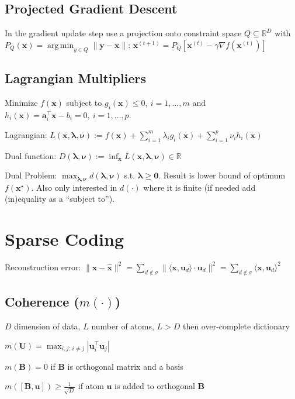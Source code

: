 \documentclass[a4paper, 11pt, landscape]{article}
\DeclareMathOperator*{\argmin}{arg\,min}
\begin{document}
\begin{multicols*}{3}
\subsection{Projected Gradient Descent}
In the gradient update step use a projection onto constraint space $Q \subseteq \mathbb{R}^D$ with $P_Q(\mathbf{x}) = \argmin_{y \in Q} \|\mathbf{y} - \mathbf{x}\|$: $\mathbf{x}^{(t+1)} = P_Q[\mathbf{x}^{(t)} - \gamma \nabla f(\mathbf{x}^{(t)})]$

\subsection{Lagrangian Multipliers}
Minimize  $f(\mathbf{x})$ subject to $g_i(\mathbf{x}) \leq 0,\ i = 1, \ldots, m$ and $h_i(\mathbf{x}) = \mathbf{a}_i^\top \mathbf{x} - b_i = 0,\ i = 1, \ldots, p$.
\begin{compactdesc}
	\item[Lagrangian:] $L(\mathbf{x}, \boldsymbol{\lambda}, \boldsymbol{\nu}) := f(\mathbf{x}) + \sum_{i=1}^m \lambda_i g_i(\mathbf{x}) + \sum_{i=1}^p \nu_i h_i(\mathbf{x})$
	\item[Dual function:] $D(\boldsymbol{\lambda}, \boldsymbol{\nu}) := \inf_{\mathbf{x}} L(\mathbf{x}, \boldsymbol{\lambda}, \boldsymbol{\nu}) \in \mathbb{R}$
	\item[Dual Problem:] $\max_{\boldsymbol{\lambda}, \boldsymbol{\nu}} d(\boldsymbol{\lambda}, \boldsymbol{\nu})$ s.t. $\boldsymbol{\lambda} \geq \mathbf{0}$. Result is lower bound of optimum $f(\mathbf{x}^\star)$. Also only interested in $d(\cdot)$ where it is finite (if needed add (in)equality as a ``subject to'').
\end{compactdesc}

\section{Sparse Coding}
Reconstruction error: $\|\mathbf{x}-\mathbf{\hat{x}}\|^2 = \sum_{d\notin\sigma}\| \langle\mathbf{x},\mathbf{u}_d \rangle \cdot \mathbf{u}_d \|^2 = \sum_{d\notin\sigma}\langle\mathbf{x},\mathbf{u}_d\rangle ^2$

\subsection{Coherence ($m(\cdot)$)}
\begin{compactitem}
	\item $D$ dimension of data, $L$ number of atoms, $L > D$ then over-complete dictionary
	\item $m(\mathbf{U}) = \max_{i,j:\, i \neq j} | \mathbf{u}_i^\top \mathbf{u}_j |$
	\item $m(\mathbf{B}) = 0$ if $\mathbf{B}$ is orthogonal matrix and a basis
	\item $m([\mathbf{B}, \mathbf{u}]) \geq \frac{1}{\sqrt{D}}$ if atom $\mathbf{u}$ is added to orthogonal $\mathbf{B}$
\end{compactitem}



\end{multicols*}
\end{document}
